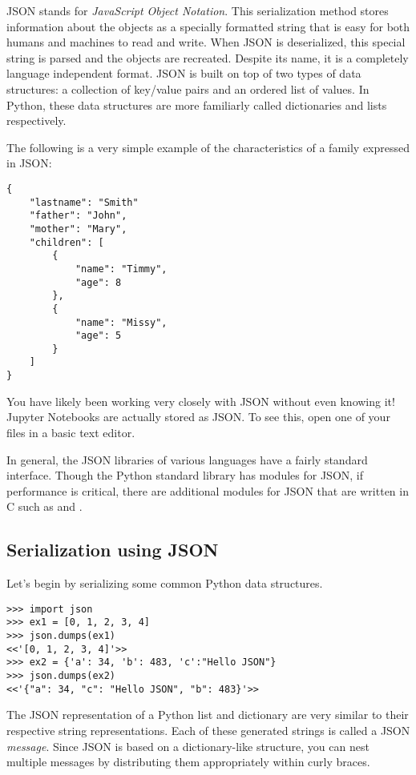 JSON stands for \emph{JavaScript Object Notation}.
This serialization method stores information about the objects as a specially formatted string that is easy for both humans and machines to read and write.
When JSON is deserialized, this special string is parsed and the objects are recreated.
Despite its name, it is a completely language independent format.
JSON is built on top of two types of data structures: a collection of key/value pairs and an ordered list of values.
In Python, these data structures are more familiarly called dictionaries and lists respectively.

The following is a very simple example of the characteristics of a family expressed in JSON:

\begin{lstlisting}
{
    "lastname": "Smith"
    "father": "John",
    "mother": "Mary",
    "children": [
        {
            "name": "Timmy",
            "age": 8
        },
        {
            "name": "Missy",
            "age": 5
        }
    ]
}
\end{lstlisting}

\begin{info}
You have likely been working very closely with JSON without even knowing it! Jupyter Notebooks are actually stored as JSON. To see this, open one of your  files in a basic text editor.
\end{info}

In general, the JSON libraries of various languages have a fairly standard interface.
Though the Python standard library has modules for JSON, if performance is critical, there are additional modules for JSON that are written in C such as  and .

\subsection*{Serialization using JSON}

Let's begin by serializing some common Python data structures.
\begin{lstlisting}
>>> import json
>>> ex1 = [0, 1, 2, 3, 4]
>>> json.dumps(ex1)
<<'[0, 1, 2, 3, 4]'>>
>>> ex2 = {'a': 34, 'b': 483, 'c':"Hello JSON"}
>>> json.dumps(ex2)
<<'{"a": 34, "c": "Hello JSON", "b": 483}'>>
\end{lstlisting}

The JSON representation of a Python list and dictionary are very similar to their respective string representations.
Each of these generated strings is called a JSON \emph{message}.
Since JSON is based on a dictionary-like structure, you can nest multiple messages by distributing them appropriately within curly braces.

